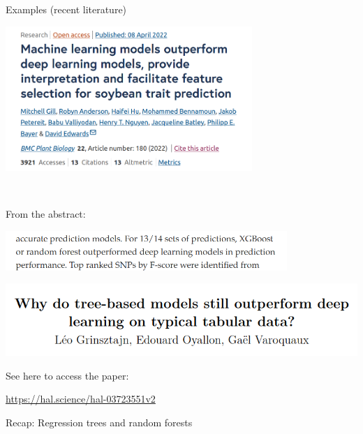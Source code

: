 \documentclass[
  10pt,
  ignorenonframetext,
]{beamer}
\begin{document}
\begin{frame}
\begin{block}{Examples (recent literature)}
\protect\hypertarget{examples-recent-literature}{}
\centering

\includegraphics[width=0.7\textwidth,height=\textheight]{graphics/trees_vs_nns.png}

\(~\)

\flushleft

From the abstract:

\includegraphics[width=0.8\textwidth,height=\textheight]{graphics/outperform.png}
\end{block}
\end{frame}

\begin{frame}
\includegraphics{graphics/why_outperform.png}

See here to access the paper:

\url{https://hal.science/hal-03723551v2}
\end{frame}

\begin{frame}
\begin{block}{Recap: Regression trees and random forests}
\protect\hypertarget{recap-regression-trees-and-random-forests}{}
\end{block}
\end{frame}
\end{document}
